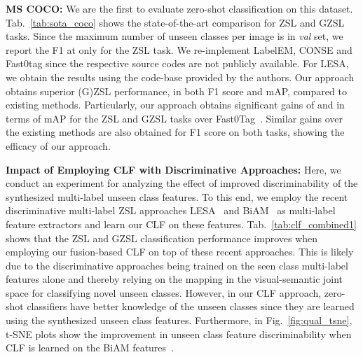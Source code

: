 \documentclass[10pt,journal,compsoc]{IEEEtran}
\begin{document}
\noindent\textbf{MS COCO:} We are the first to evaluate zero-shot classification on this dataset. Tab.~\ref{tab:sota_coco} shows the state-of-the-art comparison for ZSL and GZSL tasks. Since the maximum number of unseen classes per image is  in \textit{val} set, we report the F1 at only  for the ZSL task. We re-implement LabelEM, CONSE and Fast0tag since the respective source codes are not publicly available. For LESA, we obtain the results using the code-base provided by the authors.
Our approach obtains superior (G)ZSL performance, in both F1 score and mAP, compared to existing methods. Particularly, our approach obtains significant gains of  and  in terms of mAP for the ZSL and GZSL tasks over Fast0Tag~\cite{zhang2016fast}. Similar gains over the existing methods are also obtained for F1 score on both tasks, showing the efficacy of our approach.






\noindent\textbf{Impact of Employing CLF with Discriminative Approaches:} Here, we conduct an experiment for analyzing the effect of improved discriminability of the synthesized multi-label unseen class features. To this end, we employ the recent discriminative multi-label ZSL approaches LESA~\cite{huynh2020shared} and BiAM~\cite{narayan2021discriminative} as multi-label feature extractors and learn our CLF on these features. Tab.~\ref{tab:clf_combined1} shows that the ZSL and GZSL classification performance improves when employing our fusion-based CLF on top of these recent approaches. This is likely due to the discriminative approaches being trained on the seen class multi-label features alone and thereby relying on the mapping in the visual-semantic joint space for classifying novel unseen classes. However, in our CLF approach, zero-shot classifiers have better knowledge of the unseen classes since they are learned using the synthesized unseen class features. Furthermore, in Fig.~\ref{fig:qual_tsne}, t-SNE plots show the improvement in unseen class feature discriminability when CLF is learned on the BiAM features~\cite{narayan2021discriminative}.
\end{document}
